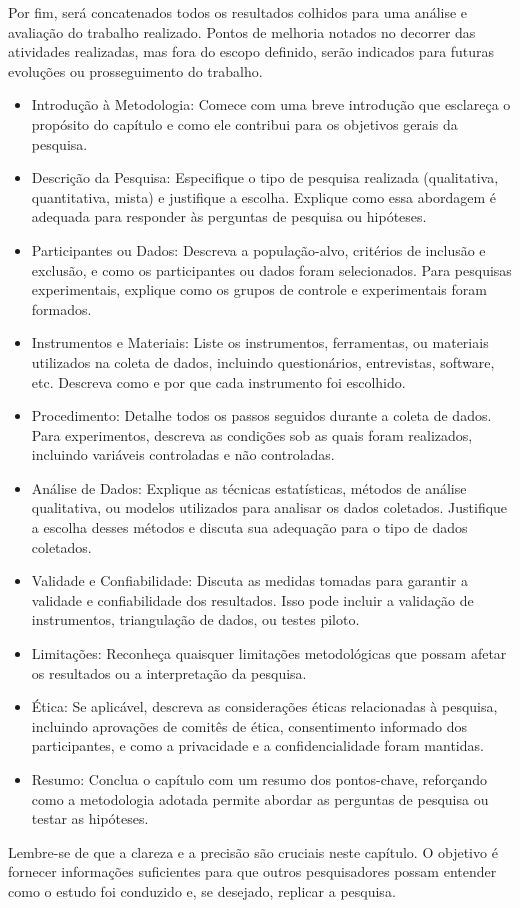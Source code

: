 Por fim, será concatenados todos os resultados colhidos para uma análise e 
avaliação do trabalho realizado. Pontos de melhoria notados no decorrer das 
atividades realizadas, mas fora do escopo definido, serão indicados para futuras 
evoluções ou prosseguimento do trabalho. 

	\begin{itemize}
		\item Introdução à Metodologia: Comece com uma breve introdução que esclareça o propósito do capítulo e como ele contribui para os objetivos gerais da pesquisa.
		\item Descrição da Pesquisa: Especifique o tipo de pesquisa realizada (qualitativa, quantitativa, mista) e justifique a escolha. Explique como essa abordagem é adequada para responder às perguntas de pesquisa ou hipóteses.
		\item Participantes ou Dados: Descreva a população-alvo, critérios de inclusão e exclusão, e como os participantes ou dados foram selecionados. Para pesquisas experimentais, explique como os grupos de controle e experimentais foram formados.
		\item Instrumentos e Materiais: Liste os instrumentos, ferramentas, ou materiais utilizados na coleta de dados, incluindo questionários, entrevistas, software, etc. Descreva como e por que cada instrumento foi escolhido.
		\item Procedimento: Detalhe todos os passos seguidos durante a coleta de dados. Para experimentos, descreva as condições sob as quais foram realizados, incluindo variáveis controladas e não controladas.
		\item Análise de Dados: Explique as técnicas estatísticas, métodos de análise qualitativa, ou modelos utilizados para analisar os dados coletados. Justifique a escolha desses métodos e discuta sua adequação para o tipo de dados coletados.
		\item Validade e Confiabilidade: Discuta as medidas tomadas para garantir a validade e confiabilidade dos resultados. Isso pode incluir a validação de instrumentos, triangulação de dados, ou testes piloto.
		\item Limitações: Reconheça quaisquer limitações metodológicas que possam afetar os resultados ou a interpretação da pesquisa.
		\item Ética: Se aplicável, descreva as considerações éticas relacionadas à pesquisa, incluindo aprovações de comitês de ética, consentimento informado dos participantes, e como a privacidade e a confidencialidade foram mantidas.
		\item Resumo: Conclua o capítulo com um resumo dos pontos-chave, reforçando como a metodologia adotada permite abordar as perguntas de pesquisa ou testar as hipóteses.
	\end{itemize}
	Lembre-se de que a clareza e a precisão são cruciais neste capítulo. O objetivo é fornecer informações suficientes para que outros pesquisadores possam entender como o estudo foi conduzido e, se desejado, replicar a pesquisa.
